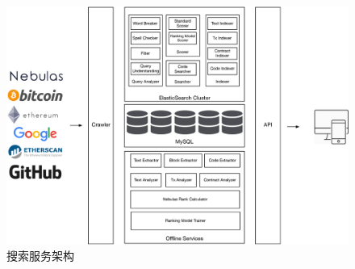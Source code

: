 \begin{figure}[h]
\centering
\includegraphics[width=16cm]{./figs/search-arch-new}
\caption{搜索服务架构}
\label{fig:search-arch}
\end{figure}

